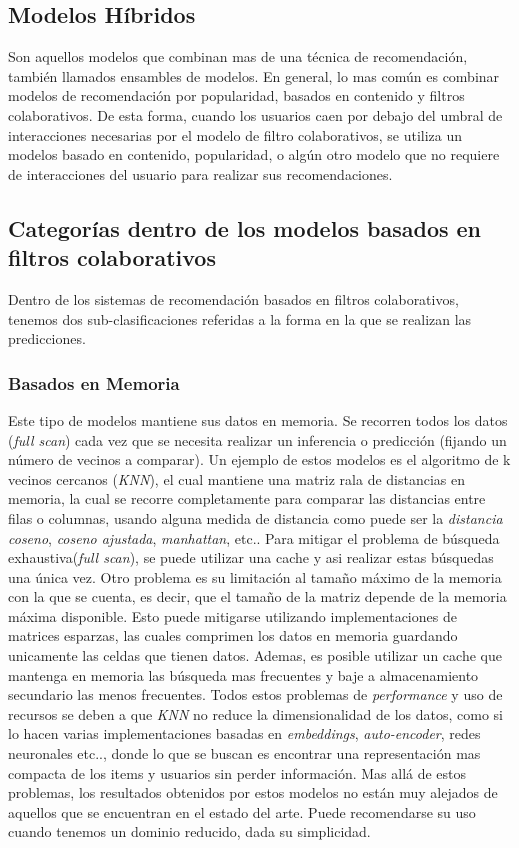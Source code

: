 \documentclass[11pt,a4paper,twoside]{thesis}
\begin{document}
\clearpage
\subsection{Modelos Híbridos}

Son aquellos modelos que combinan mas de una técnica de recomendación, también
llamados ensambles de modelos. En general, lo mas común es combinar modelos de
recomendación por popularidad, basados en contenido y filtros colaborativos. De
esta forma, cuando los usuarios caen por debajo del umbral de interacciones
necesarias por el modelo de filtro colaborativos, se utiliza un modelos basado
en contenido, popularidad, o algún otro modelo que no requiere de interacciones
del usuario para realizar sus recomendaciones.

\subsection{Categorías dentro de los modelos basados en filtros colaborativos}

Dentro de los sistemas de recomendación basados en filtros colaborativos,
tenemos dos sub-clasificaciones referidas a la forma en la que se realizan las
predicciones.

\subsubsection{Basados en Memoria}

Este tipo de modelos mantiene sus datos en memoria. Se recorren todos los datos
(\textit{full scan}) cada vez que se necesita realizar un inferencia o
predicción (fijando un número de vecinos a comparar). Un ejemplo de estos
modelos es el algoritmo de k vecinos cercanos (\textit{KNN}), el cual mantiene
una matriz rala de distancias en memoria, la cual se recorre completamente para
comparar las distancias entre filas o columnas, usando alguna medida de
distancia como puede ser la \textit{distancia coseno}, \textit{coseno
	ajustada}, \textit{manhattan}, etc.. Para mitigar el problema de búsqueda
exhaustiva(\textit{full scan}), se puede utilizar una cache y asi realizar
estas búsquedas una única vez. Otro problema es su limitación al tamaño máximo
de la memoria con la que se cuenta, es decir, que el tamaño de la matriz
depende de la memoria máxima disponible. Esto puede mitigarse utilizando
implementaciones de matrices esparzas, las cuales comprimen los datos en
memoria guardando unicamente las celdas que tienen datos. Ademas, es posible
utilizar un cache que mantenga en memoria las búsqueda mas frecuentes y baje a
almacenamiento secundario las menos frecuentes. Todos estos problemas de
\textit{performance} y uso de recursos se deben a que \textit{KNN} no reduce la
dimensionalidad de los datos, como si lo hacen varias implementaciones basadas
en \textit{embeddings}, \textit{auto-encoder}, redes neuronales etc.., donde lo
que se buscan es encontrar una representación mas compacta de los items y
usuarios sin perder información. Mas allá de estos problemas, los resultados
obtenidos por estos modelos no están muy alejados de aquellos que se encuentran
en el estado del arte. Puede recomendarse su uso cuando tenemos un dominio
reducido, dada su simplicidad.
\end{document}
